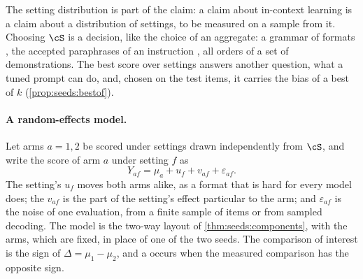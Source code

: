 \begin{refsection}
The setting distribution is part of the claim: a claim about in-context learning is a claim about a distribution of settings, to be measured on a sample from it. Choosing $\cS$ is a decision, like the choice of an aggregate: a grammar of formats \parencite{SclarEtAl2024}, the accepted paraphrases of an instruction \parencite{MizrahiEtAl2024}, all orders of a set of demonstrations. The best score over settings answers another question, what a tuned prompt can do, and, chosen on the test items, it carries the bias of a best of $k$ (\cref{prop:seeds:bestof}).

\paragraph{A random-effects model.} Let arms $a=1,2$ be scored under settings drawn independently from $\cS$, and write the score of arm $a$ under setting $f$ as
\begin{equation}\label{eq:instruments:model}
Y_{af}=\mu_a+u_f+v_{af}+\varepsilon_{af}.
\end{equation}
The setting's  $u_f$ moves both arms alike, as a format that is hard for every model does; the  $v_{af}$ is the part of the setting's effect particular to the arm; and $\varepsilon_{af}$ is the noise of one evaluation, from a finite sample of items or from sampled decoding. The model is the two-way layout of \cref{thm:seeds:components}, with the arms, which are fixed, in place of one of the two seeds. The comparison of interest is the sign of $\Delta=\mu_1-\mu_2$, and a  occurs when the measured comparison has the opposite sign.


\end{refsection}
